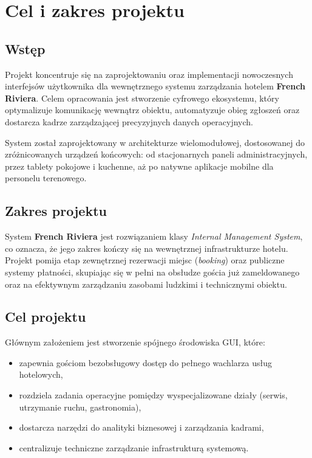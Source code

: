 \chapter{Cel i zakres projektu}

\section{Wstęp}
Projekt koncentruje się na zaprojektowaniu oraz implementacji nowoczesnych interfejsów użytkownika dla wewnętrznego systemu zarządzania hotelem \textbf{French Riviera}. Celem opracowania jest stworzenie cyfrowego ekosystemu, który optymalizuje komunikację wewnątrz obiektu, automatyzuje obieg zgłoszeń oraz dostarcza kadrze zarządzającej precyzyjnych danych operacyjnych.

System został zaprojektowany w architekturze wielomodułowej, dostosowanej do zróżnicowanych urządzeń końcowych: od stacjonarnych paneli administracyjnych, przez tablety pokojowe i kuchenne, aż po natywne aplikacje mobilne dla personelu terenowego.

\section{Zakres projektu}
System \textbf{French Riviera} jest rozwiązaniem klasy \textit{Internal Management System}, co oznacza, że jego zakres kończy się na wewnętrznej infrastrukturze hotelu. Projekt pomija etap zewnętrznej rezerwacji miejsc (\textit{booking}) oraz publiczne systemy płatności, skupiając się w pełni na obsłudze gościa już zameldowanego oraz na efektywnym zarządzaniu zasobami ludzkimi i technicznymi obiektu.

\section{Cel projektu}
Głównym założeniem jest stworzenie spójnego środowiska GUI, które:
\begin{itemize}
    \item zapewnia gościom bezobsługowy dostęp do pełnego wachlarza usług hotelowych,
    \item rozdziela zadania operacyjne pomiędzy wyspecjalizowane działy (serwis, utrzymanie ruchu, gastronomia),
    \item dostarcza narzędzi do analityki biznesowej i zarządzania kadrami,
    \item centralizuje techniczne zarządzanie infrastrukturą systemową.
\end{itemize}

